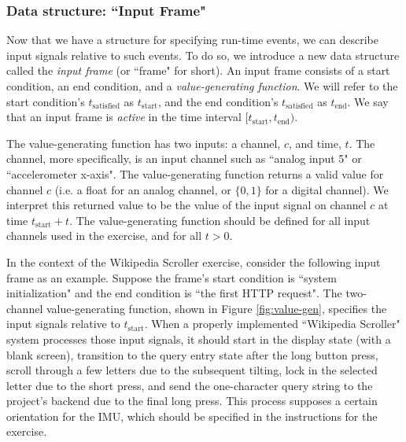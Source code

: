 \documentclass[12pt]{article}
\begin{document}
\subsubsection{Data structure: ``Input Frame"}
Now that we have a structure for specifying run-time events, we can describe input signals relative to such events.  To do so, we introduce a new data structure called the \textit{input frame} (or ``frame" for short).  An input frame consists of a start condition, an end condition, and a \textit{value-generating function}.  We will refer to the start condition's $t_{\text{satisfied}}$ as $t_{\text{start}}$, and the end condition's $t_{\text{satisfied}}$ as $t_{\text{end}}$.  We say that an input frame is \textit{active} in the time interval $[t_{\text{start}}, t_{\text{end}})$.

The value-generating function has two inputs: a channel, $c$, and time, $t$.  The channel, more specifically, is an input channel such as ``analog input 5" or ``accelerometer x-axis".  The value-generating function returns a valid value for channel $c$ (i.e. a float for an analog channel, or $\{0,1\}$ for a digital channel).  We interpret this returned value to be the value of the input signal on channel $c$ at time $t_{\text{start}}+t$.  The value-generating function should be defined for all input channels used in the exercise, and for all $t>0$.

In the context of the Wikipedia Scroller exercise, consider the following input frame as an example.  Suppose the frame's start condition is ``system initialization" and the end condition is ``the first HTTP request".  The two-channel value-generating function, shown in Figure \ref{fig:value-gen}, specifies the input signals relative to $t_{\text{start}}$.  When a properly implemented ``Wikipedia Scroller" system processes those input signals, it should start in the display state (with a blank screen), transition to the query entry state after the long button press, scroll through a few letters due to the subsequent tilting, lock in the selected letter due to the short press, and send the one-character query string to the project's backend due to the final long press.  This process supposes a certain orientation for the IMU, which should be specified in the instructions for the exercise.
\end{document}
